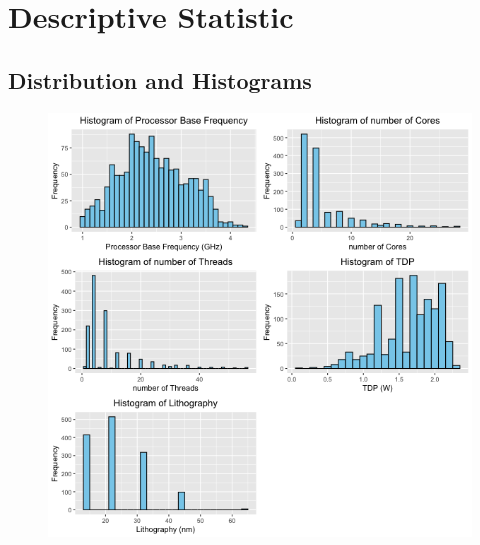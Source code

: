 \section{Descriptive Statistic}
\subsection{Distribution and Histograms}
\begin{figure}[H]
    \begin{center}
    \includegraphics[width=14cm]{graphics/histogram.png}
    \end{center}
\end{figure}
